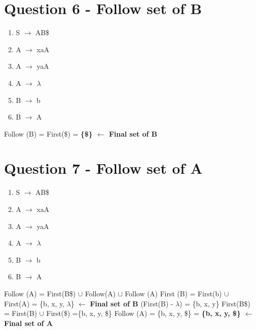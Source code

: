 \documentclass{report}
\begin{document}
\vspace{-1.5em}
\section{Question 6 - Follow set of B}
\vspace{-1em}
\begin{multicols}{2}
  \begin{enumerate}
    \setlength\itemsep{-.25em}
    \item S $\rightarrow$ AB\$
    \item A $\rightarrow$ xaA
    \item A $\rightarrow$ yaA
    \item A $\rightarrow$ $\lambda$
    \item B $\rightarrow$ b
    \item B $\rightarrow$ A
  \end{enumerate}
\setlength{\leftskip}{-12em}
Follow (B) = First(\$) = \textbf{\{\$\}  $\leftarrow$ Final set of B}
\newline\newline\newline\newline
\end{multicols}

\vspace{-1.5em}
\section{Question 7 - Follow set of A}
\vspace{-1em}
\begin{multicols}{2}
  \begin{enumerate}
    \setlength\itemsep{-.25em}
    \item S $\rightarrow$ AB\$
    \item A $\rightarrow$ xaA
    \item A $\rightarrow$ yaA
    \item A $\rightarrow$ $\lambda$
    \item B $\rightarrow$ b
    \item B $\rightarrow$ A\newline\newline
  \end{enumerate}
\setlength{\leftskip}{-12em}
Follow (A) = First(B\$) $\cup$ Follow(A) $\cup$ Follow (A)\newline
First (B) = First(b) $\cup$  First(A) = \{b, x, y, $\lambda$\}  $\leftarrow$ \textbf{Final set of B}\newline
\indent\hspace{.25cm}(First(B) - $\lambda$) = \{b, x, y\}\newline
\indent\hspace{.25cm}First(B\$) = First(B) $\cup$ First(\$) =\{b, x, y, \$\}\newline
Follow (A) = \{b, x, y, \$\} = \textbf{\{b, x, y, \$\} $\leftarrow$ Final set of A}\newline
\newline
\end{multicols}
\end{document}
